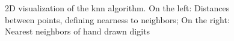 \begin{figure}
    \caption{2D visualization of the \gls{knn} algorithm. On the left: Distances between points, defining nearness to neighbors; On the right: Nearest neighbors of hand drawn digits \cite{lewick2007clustering}}
    \label{fig:knnvisualization}
\end{figure}

